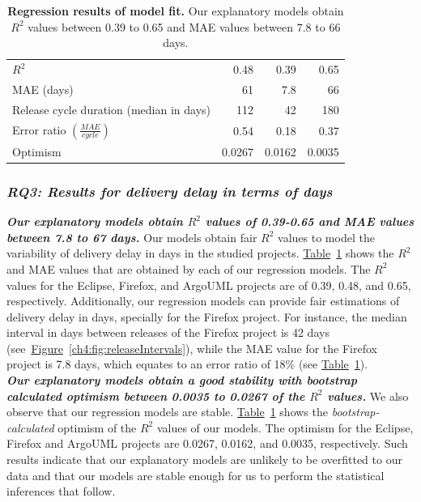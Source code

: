\begin{table}
	\centering
	\footnotesize
	\caption{\textbf{Regression results of model fit.} Our explanatory
		models obtain $R^2$ values between 0.39 to 0.65 and MAE values between
	7.8 to 66 days.}
	\label{ch4:tbl:regression_results}
	\def\arraystretch{1.5}
	\begin{tabular}{lrrr}
		\hline 
		\centering{\textbf{Metric/Project}} &
		\centering{\textbf{Eclipse}} & \centering{\textbf{Firefox}} &
		\centering{\textbf{ArgoUML}} \tabularnewline
		\hline 
		$R^2$ & 0.48  & 0.39 & 0.65 \tabularnewline
		\hline 
		MAE (days) & 61 & 7.8  & 66 \tabularnewline
		\hline 
		Release cycle duration (median in days) & 112 & 42 & 180 \tabularnewline
		\hline
		Error ratio $(\frac{MAE}{cycle})$ & 0.54  & 0.18  & 0.37 \tabularnewline
		\hline 
		Optimism & 0.0267 & 0.0162 & 0.0035 \tabularnewline
		\hline 
	\end{tabular}
\end{table}

\subsubsection*{\textit{\textbf{RQ3: Results for delivery delay in terms of days}}}

\noindent\textbf{\textit{Our explanatory models obtain $R^2$ values of 0.39-0.65
and MAE values between 7.8 to 67 days.}} Our models obtain fair $R^2$ values to
model the variability of delivery delay in days in the studied projects.
\hyperref[ch4:tbl:regression_results]{Table}~\ref{ch4:tbl:regression_results} shows the
$R^2$ and MAE values that are obtained by each of our regression models. The
$R^2$ values for the Eclipse, Firefox, and ArgoUML projects are of 0.39, 0.48,
and 0.65, respectively. 
Additionally, our regression models can provide fair
estimations of delivery delay in days, specially for the Firefox project. For
instance, the median interval in days between releases of the Firefox project is
42 days
(see~\hyperref[ch4:fig:releaseIntervals]{Figure}~\ref{ch4:fig:releaseIntervals}), while
the MAE value for the Firefox project is 7.8 days, which equates to an error
ratio of 18\% (see
\hyperref[ch4:tbl:regression_results]{Table}~\ref{ch4:tbl:regression_results}).\\

\noindent\textbf{\textit{Our explanatory models obtain a good stability with bootstrap
calculated optimism between 0.0035 to 0.0267 of the $R^2$ values.}} We also
observe that our regression models are stable.
\hyperref[ch4:tbl:regression_results]{Table}~\ref{ch4:tbl:regression_results} shows the
\textit{bootstrap-calculated} optimism of the $R^2$ values of our models. The
optimism for the Eclipse, Firefox and ArgoUML projects are 0.0267, 0.0162, and 0.0035,
respectively. Such results indicate that our explanatory models are unlikely to
be overfitted to our data and that our models are stable enough for us to perform the
statistical inferences that follow. 


